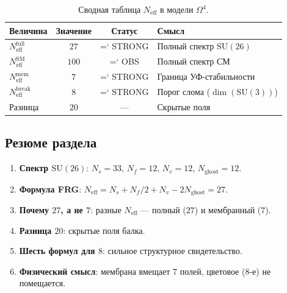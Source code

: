 \documentclass[11pt,a4paper]{article}
\newcommand{\SU}{\mathrm{SU}}
\newcommand{\Om}{\Omega^4}
\newcommand{\Neff}{N_{\text{eff}}}
\renewcommand{\texttt}[1]{{\ttfamily\hyphenchar\font=`\- #1}}
\theoremstyle{definition}
\begin{document}
\begin{table}[htbp]
\centering
\caption{Сводная таблица $\Neff$ в модели $\Om$.}
\label{tab:neff-all}
\begin{tabular}{p{3.5cm}ccp{4cm}}
\toprule
Величина & Значение & Статус & Смысл \\
\midrule
$\Neff^{\text{full}}$ & $27$ & \texttt{STRONG} & 
    Полный спектр $\SU(26)$ \\[0.3em]
$\Neff^{\text{SM}}$ & $100$ & \texttt{OBS} & 
    Полный спектр СМ \\[0.3em]
$\Neff^{\text{mem}}$ & $7$ & \texttt{STRONG} & 
    Граница УФ-стабильности \\[0.3em]
$\Neff^{\text{break}}$ & $8$ & \texttt{STRONG} & 
    Порог слома ($\dim(\SU(3))$) \\[0.3em]
Разница & $20$ & --- & 
    Скрытые поля \\
\bottomrule
\end{tabular}
\end{table}

\subsection{Резюме раздела}
\label{subsec:neff-summary}

\begin{enumerate}
    \item \textbf{Спектр $\SU(26)$}: $N_s = 33$, $N_f = 12$, 
          $N_v = 12$, $N_{\text{ghost}} = 12$.
    \item \textbf{Формула FRG}: 
          $\Neff = N_s + N_f/2 + N_v - 2 N_{\text{ghost}} = 27$.
    \item \textbf{Почему $27$, а не $7$}: разные $N_{\text{eff}}$ — 
          полный ($27$) и мембранный ($7$).
    \item \textbf{Разница $20$}: скрытые поля балка.
    \item \textbf{Шесть формул для $8$}: сильное структурное 
          свидетельство.
    \item \textbf{Физический смысл}: мембрана вмещает $7$ полей, 
          цветовое ($8$-е) не помещается.
\end{enumerate}

\end{document}
